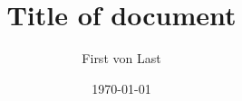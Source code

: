 

\author{First von Last}
\title{Title of document}
\date{\today}


\maketitle
\tableofcontents







